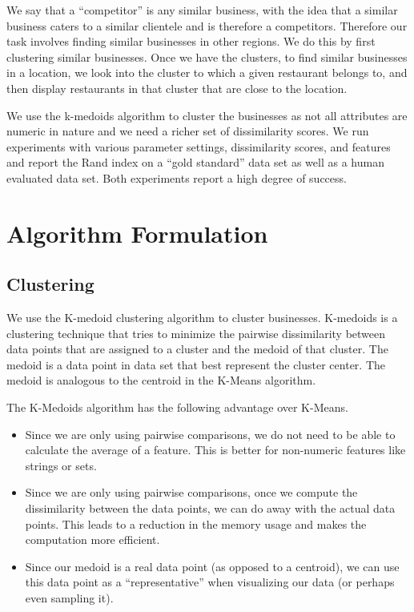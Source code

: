 \documentclass{article}
\begin{document}
   We say that a ``competitor'' is any similar business, with the idea that a similar business caters to a similar clientele and is therefore a competitors.
   Therefore our task involves finding similar businesses in other regions.
   We do this by first clustering similar businesses.
   Once we have the clusters, to find similar businesses in a location, we look into the cluster to which a given restaurant belongs to, and then display restaurants in that cluster that are close to the location.  

   We use the k-medoids algorithm to cluster the businesses as not all attributes are numeric in nature and we need a richer set of dissimilarity scores.
   We run experiments with various parameter settings, dissimilarity scores, and features and report the Rand index on a ``gold standard'' data set as well as a human evaluated data set.
   Both experiments report a high degree of success.

\section{Algorithm Formulation}

   \subsection{Clustering}
      We use the K-medoid clustering algorithm to cluster businesses.
      K-medoids is a clustering technique that tries to minimize the pairwise dissimilarity between data points that are assigned to a cluster and the medoid of that cluster.
      The medoid is a data point in data set that best represent the cluster center.
      The medoid is analogous to the centroid in the K-Means algorithm.

      The K-Medoids algorithm has the following advantage over K-Means.
      \begin{itemize} 
         \setlength\itemsep{0.1cm}
         \item
            Since we are only using pairwise comparisons, we do not need to be able to calculate the average of a feature.
            This is better for non-numeric features like strings or sets.
         \item
            Since we are only using pairwise comparisons, once we compute the dissimilarity between the data points, we can do away with the actual data points.
            This leads to a reduction in the memory usage and makes the computation more efficient.
         \item
            Since our medoid is a real data point (as opposed to a centroid), we can use this data point as a ``representative'' when visualizing our data (or perhaps even sampling it).
      \end{itemize}
\end{document}
